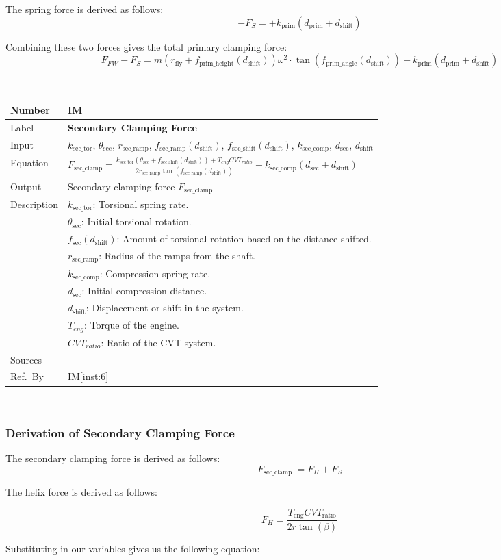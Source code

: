 \documentclass[12pt]{article}
\newcommand{\colAwidth}{0.13\textwidth}
\newcommand{\colBwidth}{0.82\textwidth}
\newcounter{instnum} %
\newcommand{\iref}[1]{IM\ref{#1}}
\newcommand{\definstance}[7] {
~\newline
\noindent
\begin{minipage}{\textwidth}
\renewcommand*{\arraystretch}{1.5}
\begin{tabular}{| p{\colAwidth} | p{\colBwidth}|}
  \hline
  \rowcolor[gray]{0.9}
  Number& IM\refstepcounter{instnum}\theinstnum \label{inst:\theinstnum}\\
  \hline
  Label& \bf #1 \\
  \hline
  Input& #2\\
  \hline
  Equation& #3\\
  \hline
  Output& #4\\
  \hline
  Description& #5 \\
  \hline
  Sources& #6 \\
  \hline
  Ref.\ By & #7\\
  \hline
\end{tabular}
\end{minipage}\\
}
\begin{document}
The spring force is derived as follows: 
\[
-F_S = + k_{\text{prim}} (d_{\text{prim}} + d_{\text{shift}})
\]

Combining these two forces gives the total primary clamping force:
\[
F_{FW} - F_S = m (r_{\text{fly}} + f_{\text{prim\_height}}(d_{\text{shift}}))\omega^2 \cdot \tan(f_{\text{prim\_angle}}(d_{\text{shift}})) + k_{\text{prim}} (d_{\text{prim}} + d_{\text{shift}})
\]

\definstance
{Secondary Clamping Force}
{$k_{\text{sec\_tor}}$, $\theta_{\text{sec}}$, $r_{\text{sec\_ramp}}$, $f_{\text{sec\_ramp}}(d_{\text{shift}})$, $f_{\text{sec\_shift}}(d_{\text{shift}})$, $k_{\text{sec\_comp}}$, $d_{\text{sec}}$, $d_{\text{shift}}$} %
{$F_{\text{sec\_clamp}} = \frac{k_{\text{sec\_tor}} (\theta_{\text{sec}} + f_{\text{sec\_shift}}(d_{\text{shift}})) + T_{eng} CVT_{ratio}}{2 r_{\text{sec\_ramp}} \tan(f_{\text{sec\_ramp}}(d_{\text{shift}}))} + k_{\text{sec\_comp}} (d_{\text{sec}} + d_{\text{shift}})$} %
{Secondary clamping force $F_{\text{sec\_clamp}}$} %
{$k_{\text{sec\_tor}}$: Torsional spring rate. \\
  &$\theta_{\text{sec}}$: Initial torsional rotation. \\
  &$f_{\text{sec}}(d_{\text{shift}})$: Amount of torsional rotation based on the distance shifted. \\
  &$r_{\text{sec\_ramp}}$: Radius of the ramps from the shaft. \\
  &$k_{\text{sec\_comp}}$: Compression spring rate. \\
  &$d_{\text{sec}}$: Initial compression distance. \\
  &$d_{\text{shift}}$: Displacement or shift in the system. \\
  &$T_{eng}$: Torque of the engine. \\
  &$CVT_{ratio}$: Ratio of the CVT system.
} %
{} %
{\iref{inst:6}}

\subsubsection*{Derivation of Secondary Clamping Force}

The secondary clamping force is derived as follows:
\[
F_{\text{sec\_clamp}}\ = F_H + F_S
\]

The helix force is derived as follows:

\[
F_H = \frac{T_{\text{eng}}CVT_{\text{ratio}}}{2r\tan(\beta)}
\]

Substituting in our variables gives us the following equation:
\end{document}
